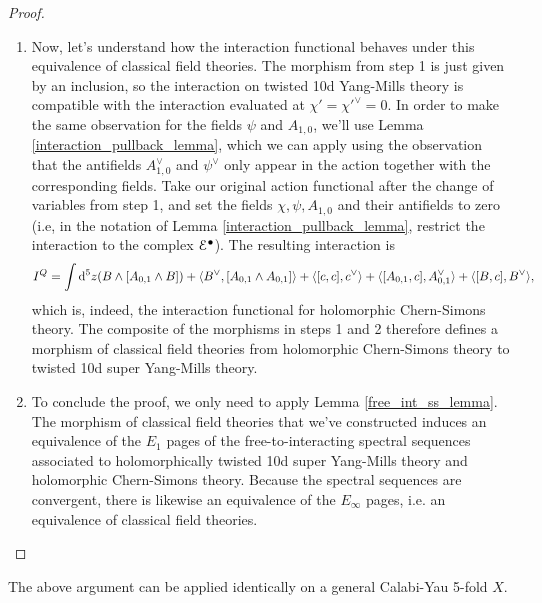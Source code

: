 \documentclass[10pt, oneside]{article}
\begin{document}
\begin{proof}
\begin{enumerate}
 \item Now, let's understand how the interaction functional behaves under this equivalence of classical field theories.  The morphism from step 1 is just given by an inclusion, so the interaction on twisted 10d Yang-Mills theory is compatible with the interaction evaluated at $\chi'=\chi'^\vee=0$.  In order to make the same observation for the fields $\psi$ and $A_{1,0}$, we'll use Lemma \ref{interaction_pullback_lemma}, which we can apply using the observation that the antifields $A_{1,0}^\vee$ and $\psi^\vee$ only appear in the action together with the corresponding fields.  Take our original action functional after the change of variables from step 1, and set the fields $\chi, \psi, A_{1,0}$ and their antifields to zero (i.e, in the notation of Lemma \ref{interaction_pullback_lemma}, restrict the interaction to the complex $\mathcal{E}^\bullet$).  The resulting interaction is 
 \[
  I^Q = \int {\rm d}^5z (B \wedge [A_{0,1} \wedge B]) + \langle B^\vee, [A_{0,1} \wedge A_{0,1}] \rangle + \langle [c,c], c^\vee \rangle + \langle [A_{0,1}, c], A_{0,1}^\vee \rangle + \langle [B,c], B^\vee \rangle,
 \]
 which is, indeed, the interaction functional for holomorphic Chern-Simons theory.  The composite of the morphisms in steps 1 and 2 therefore defines a morphism of classical field theories from holomorphic Chern-Simons theory to twisted 10d super Yang-Mills theory.
 
 \item To conclude the proof, we only need to apply Lemma \ref{free_int_ss_lemma}.  The morphism of classical field theories that we've constructed induces an equivalence of the $E_1$ pages of the free-to-interacting spectral sequences associated to holomorphically twisted 10d super Yang-Mills theory and holomorphic Chern-Simons theory.  Because the spectral sequences are convergent, there is likewise an equivalence of the $E_\infty$ pages, i.e. an equivalence of classical field theories.
\end{enumerate}
\end{proof}

The above argument can be applied identically on a general Calabi-Yau 5-fold $X$.
 

\pagestyle{bib}
\printbibliography
\end{document}
